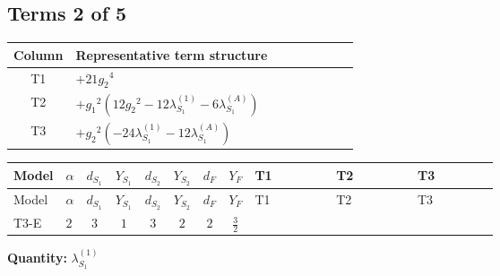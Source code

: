 \documentclass[8pt]{article}
\begin{document}
\begin{landscape}
\subsection*{Terms 2 of 5}
\begin{center}
\begin{tabular}{@{}c >{\raggedright\arraybackslash}p{0.82\linewidth}@{}}
\toprule
Column & Representative term structure \\
\midrule
T1 & \(\displaystyle +21 {g_2}^4\) \\
\midrule
T2 & \(\displaystyle +{g_1}^2 \left(12 {g_2}^2-12 {\lambda_{S_1}^{(1)}}-6 {\lambda_{S_1}^{(A)}}\right)\) \\
\midrule
T3 & \(\displaystyle +{g_2}^2 (-24 {\lambda_{S_1}^{(1)}}-12 {\lambda_{S_1}^{(A)}})\) \\
\midrule
\bottomrule
\end{tabular}
\end{center}
\smallskip
\tiny
\begin{longtable}{@{}llcccccc >{\raggedright\arraybackslash}p{0.21\linewidth} >{\raggedright\arraybackslash}p{0.21\linewidth} >{\raggedright\arraybackslash}p{0.21\linewidth}@{}}
\toprule
Model & $\alpha$ & $d_{S_1}$ & $Y_{S_1}$ & $d_{S_2}$ & $Y_{S_2}$ & $d_F$ & $Y_F$ & T1 & T2 & T3 \\
\midrule
\endfirsthead
\toprule
Model & $\alpha$ & $d_{S_1}$ & $Y_{S_1}$ & $d_{S_2}$ & $Y_{S_2}$ & $d_F$ & $Y_F$ & T1 & T2 & T3 \\
\midrule
\endhead
T3-E & $2$ & $3$ & $1$ & $3$ & $2$ & $2$ & $\frac{3}{2}$ & \scriptsize\adjustbox{max width=\linewidth}{$\begin{gathered} +21 {g_2}^4\end{gathered}$} & \scriptsize\adjustbox{max width=\linewidth}{$\begin{gathered} +{g_1}^2 \left(12 {g_2}^2-12 {\lambda_{S_1}^{(1)}}-6 {\lambda_{S_1}^{(A)}}\right)\end{gathered}$} & \scriptsize\adjustbox{max width=\linewidth}{$\begin{gathered} +{g_2}^2 (-24 {\lambda_{S_1}^{(1)}}-12 {\lambda_{S_1}^{(A)}})\end{gathered}$} \\
\midrule
\bottomrule
\end{longtable}
\clearpage
\noindent\textbf{Quantity: }$\lambda_{S_1}^{(1)}$\par\smallskip

\end{landscape}
\end{document}
